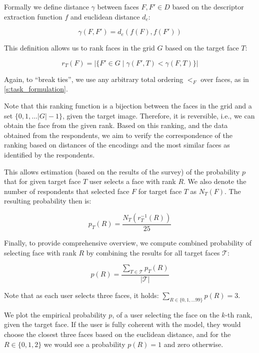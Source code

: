 Formally we define distance $\gamma$ between faces $F, F' \in D$ based on the descriptor extraction function $f$ and euclidean distance $d_e$:

$$
\gamma(F, F') = d_e(f(F), f(F'))
$$

This definition allows us to rank faces in the grid $G$ based on the target face $T$:

$$
    r_T(F) = |\{F'\in G\mid\gamma(F', T) < \gamma(F, T)\}|
$$

Again, to ``break ties'', we use any arbitrary total ordering $<_F$ over faces, as in \autoref{s:task_formulation}.



Note that this ranking function is a bijection between the faces in the grid and a set $\{0, 1, \ldots |G| - 1\}$, given the target image. Therefore, it is reversible, i.e., we can obtain the face from the given rank. Based on this ranking, and the data obtained from the respondents, we aim to verify the correspondence of the ranking based on distances of the encodings and the most similar faces as identified by the respondents.

This allows estimation (based on the results of the survey)  of the probability $p$ that for given target face $T$ user selects a face with rank $R$. We also denote the number of respondents that selected face $F$ for target face $T$ as $N_T(F)$. The resulting probability then is:

$$
    p_T(R) = \frac{N_T(r_T^{-1}(R))}{25}
$$

Finally, to provide comprehensive overview, we compute combined probability of selecting face with rank $R$ by combining the results for all target faces $\mathcal{T}$:

$$
p(R) = \frac{\sum_{T\in \mathcal{T}} p_T(R)}{|\mathcal{T}|}
$$

Note that as each user selects three faces, it holds: $\sum_{R\in\{0,1,\ldots99\}} p(R) = 3$.

We plot the empirical probability $p$, of a user selecting the face on the $k$-th rank, given the target face. If the user is fully coherent with the model, they would choose the closest three faces based on the euclidean distance, and for the $R \in \{0,1,2\}$ we would see a probability $p(R) = 1$ and zero otherwise. 

